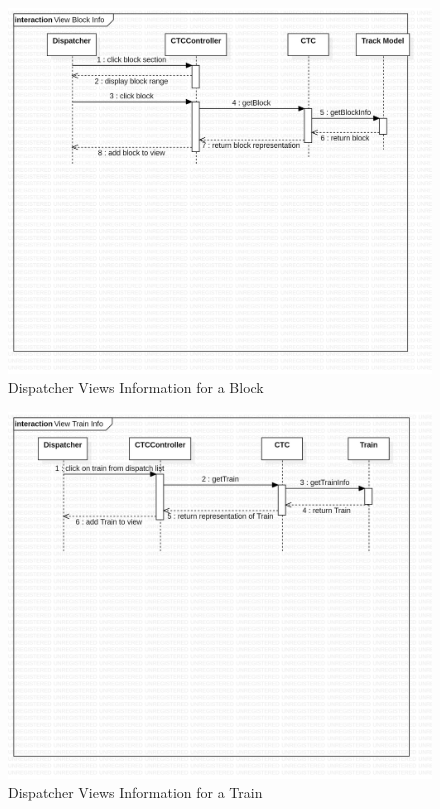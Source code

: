 \documentclass{article}
\begin{document}
     \begin{figure}[H]
        \centering
        \includegraphics[width=\textwidth]{./CTC/View_Block_Info.png}
        \caption{Dispatcher Views Information for a Block}
        \label{fig:Use Case: Dispatcher Views Information for a Block}
    \end{figure}
     \begin{figure}[H]
        \centering
        \includegraphics[width=\textwidth]{./CTC/View_Train_Info.png}
        \caption{Dispatcher Views Information for a Train}
        \label{fig:Use Case: Dispatcher Views Information for a Train}
    \end{figure}
\end{document}
